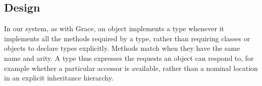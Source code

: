 






\subsection{Design}





%


In our system,
as with Grace\citep{graceOnward12},
an object implements a type whenever it
implements all the methods required by a type,
rather than requiring classes or objects to declare types explicitly.
Methods match when they have the same name and arity.
A type thus expresses the requests an object can respond to,
for example whether a particular accessor is available,
rather than a nominal location in an explicit inheritance hierarchy.

